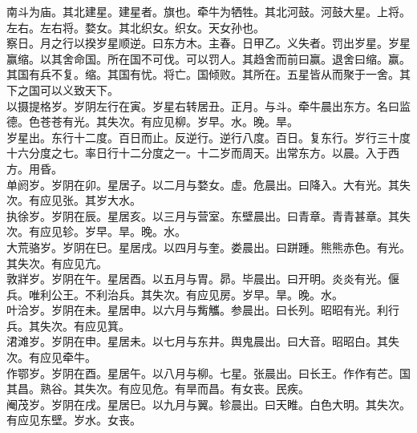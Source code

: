 \documentclass{zhvt-classic}
\begin{document}
\hspace*{2em}南斗为庙。其北建星。建星者。旗也。牵牛为牺牲。其北河鼓。河鼓大星。上将。左右。左右将。婺女。其北织女。织女。天女孙也。\\
\hspace*{2em}察日。月之行以揆岁星顺逆。曰东方木。主春。日甲乙。义失者。罚出岁星。岁星赢缩。以其舍命国。所在国不可伐。可以罚人。其趋舍而前曰赢。退舍曰缩。赢。其国有兵不复。缩。其国有忧。将亡。国倾败。其所在。五星皆从而聚于一舍。其下之国可以义致天下。\\
\hspace*{2em}以摄提格岁。岁阴左行在寅。岁星右转居丑。正月。与斗。牵牛晨出东方。名曰监德。色苍苍有光。其失次。有应见柳。岁早。水。晚。旱。\\
\hspace*{2em}岁星出。东行十二度。百日而止。反逆行。逆行八度。百日。复东行。岁行三十度十六分度之七。率日行十二分度之一。十二岁而周天。出常东方。以晨。入于西方。用昏。\\
\hspace*{2em}单阏岁。岁阴在卯。星居子。以二月与婺女。虚。危晨出。曰降入。大有光。其失次。有应见张。其岁大水。\\
\hspace*{2em}执徐岁。岁阴在辰。星居亥。以三月与营室。东壁晨出。曰青章。青青甚章。其失次。有应见轸。岁早。旱。晚。水。\\
\hspace*{2em}大荒骆岁。岁阴在巳。星居戌。以四月与奎。娄晨出。曰跰踵。熊熊赤色。有光。其失次。有应见亢。\\
\hspace*{2em}敦牂岁。岁阴在午。星居酉。以五月与胃。昴。毕晨出。曰开明。炎炎有光。偃兵。唯利公王。不利治兵。其失次。有应见房。岁早。旱。晚。水。\\
\hspace*{2em}叶洽岁。岁阴在未。星居申。以六月与觜觿。参晨出。曰长列。昭昭有光。利行兵。其失次。有应见箕。\\
\hspace*{2em}涒滩岁。岁阴在申。星居未。以七月与东井。舆鬼晨出。曰大音。昭昭白。其失次。有应见牵牛。\\
\hspace*{2em}作鄂岁。岁阴在酉。星居午。以八月与柳。七星。张晨出。曰长王。作作有芒。国其昌。熟谷。其失次。有应见危。有旱而昌。有女丧。民疾。\\
\hspace*{2em}阉茂岁。岁阴在戌。星居巳。以九月与翼。轸晨出。曰天睢。白色大明。其失次。有应见东壁。岁水。女丧。\\
\end{document}
